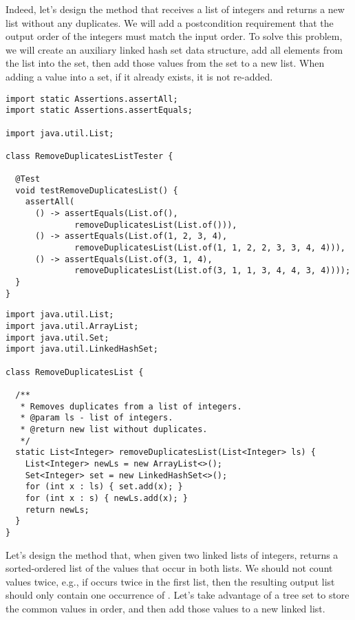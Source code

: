 Indeed, let's design the  method that receives a list of integers and returns a new list without any duplicates. 
We will add a postcondition requirement that the output order of the integers must match the input order. 
To solve this problem, we will create an auxiliary linked hash set data structure, add all elements from the list into the set, then add those values from the set to a new list. 
When adding a value into a set, if it already exists, it is not re-added.

\begin{lstlisting}[language=MyJava]
import static Assertions.assertAll;
import static Assertions.assertEquals;

import java.util.List;

class RemoveDuplicatesListTester {

  @Test
  void testRemoveDuplicatesList() {
    assertAll(
      () -> assertEquals(List.of(), 
              removeDuplicatesList(List.of())),
      () -> assertEquals(List.of(1, 2, 3, 4), 
              removeDuplicatesList(List.of(1, 1, 2, 2, 3, 3, 4, 4))),
      () -> assertEquals(List.of(3, 1, 4), 
              removeDuplicatesList(List.of(3, 1, 1, 3, 4, 4, 3, 4))));
  }
}
\end{lstlisting}

\begin{lstlisting}[language=MyJava]
import java.util.List;
import java.util.ArrayList;
import java.util.Set;
import java.util.LinkedHashSet;

class RemoveDuplicatesList {

  /**
   * Removes duplicates from a list of integers.
   * @param ls - list of integers.
   * @return new list without duplicates.
   */
  static List<Integer> removeDuplicatesList(List<Integer> ls) {
    List<Integer> newLs = new ArrayList<>();
    Set<Integer> set = new LinkedHashSet<>();
    for (int x : ls) { set.add(x); }
    for (int x : s) { newLs.add(x); }
    return newLs;
  }
}
\end{lstlisting}

Let's design the  method that, when given two linked lists of integers, returns a sorted-ordered list of the values that occur in both lists. 
We should not count values twice, e.g., if  occurs twice in the first list, then the resulting output list should only contain one occurrence of . 
Let's take advantage of a tree set to store the common values in order, and then add those values to a new linked list.

